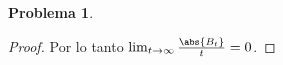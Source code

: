 \documentclass[a5paper,oneside]{amsart}
\theoremstyle{plain}
\theoremstyle{definition}
\newtheorem{problema}{Problema}
\begin{document}
\begin{problema}
\begin{enumerate}
\begin{proof}
Por lo tanto $\lim_{t\to\infty }\frac{\abs{B_t}}{t} =0$.
\end{proof}
\end{enumerate}
\end{problema}
%
%
%
\end{document}

